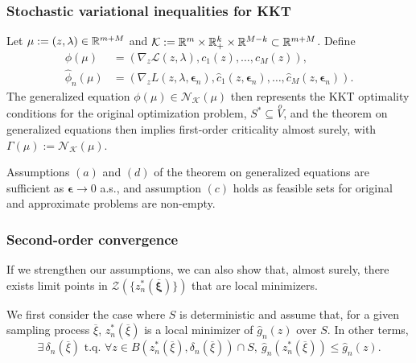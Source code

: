 \documentclass{beamer}
\def\bxi{\boldsymbol\xi}
\def\bepsilon{\boldsymbol\epsilon}
\begin{document}
\begin{frame}
\frametitle{Stochastic variational inequalities for KKT}

Let $\mu := (z,\lambda) \in \mathbb{R}^{m+M}$ and $\mathcal{K} := \mathbb{R}^m
\times \mathbb{R}^k_+ \times \mathbb{R}^{M-k} \subset \mathbb{R}^{m+M}$.
Define
\begin{align*}
	\phi(\mu) &= \left( \nabla_z \mathcal{L}(z, \lambda), c_1(z),
	\ldots, c_M(z) \right),\\
	\hat{\phi}_n(\mu) &= \left( \nabla_z L(z, \lambda, \bepsilon_n),
	\hat{c}_1(z, \bepsilon_n), \ldots, \hat{c}_{M}(z,
	\bepsilon_n)\right).
\end{align*}
The generalized equation $\phi(\mu) \in \mathcal{N}_{\mathcal{K}}(\mu)$ then represents the KKT optimality conditions for the original optimization problem, $S^* \subseteq \overset{o}{V}$, and the theorem on generalized equations then implies first-order criticality almost surely, with $\Gamma(\mu) := \mathcal{N}_{\mathcal{K}}(\mu)$.

Assumptions $(a)$ and $(d)$ of the theorem on generalized equations are sufficient as $\bepsilon \rightarrow 0$ a.s., and assumption $(c)$ holds as feasible sets for original and approximate problems are non-empty.



\end{frame}

\begin{frame}
\frametitle{Second-order convergence}

If we strengthen our assumptions, we can also show that, almost surely, there exists limit points in $\mathcal{Z}\left(\lbrace z^*_n(\overline{\bxi})\rbrace\right)$ that are local minimizers.

\mbox{}

We first consider the case where $S$ is deterministic and assume that, for a given sampling process $\overline{\xi}$, $z_n^*(\overline{\xi})$ is a local minimizer of $\hat{g}_n(z)$ over $S$.
In other terms,
\[
\exists\, \delta_n(\overline{\xi}) \text{ t.q. } \forall z \in
B \left( z_n^*(\overline{\xi}), \delta_n(\overline{\xi}) \right) \cap
S,\ \hat{g}_n \left( z_n^*(\overline{\xi}) \right) \leq \hat{g}_n(z).
\]

\end{frame}
\end{document}
